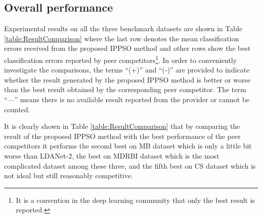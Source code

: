 \documentclass[conference]{IEEEtran}
\begin{document}
\subsection{Overall performance}\label{sec:Performance}

Experimental results on all the three benchmark datasets are shown in Table \ref{table:ResultComparison} where the last row denotes the mean classification errors received from the proposed IPPSO method and other rows show the best classification errors reported by peer competitors\footnote{It is a convention in the deep learning community that only the best result is reported.}. In order to conveniently investigate the comparisons, the terms “(+)” and “(-)” are provided to indicate whether the result generated by the proposed IPPSO method is better or worse than the best result obtained by the corresponding peer competitor. The term “—” means there is no available result reported from the provider or cannot be counted.

It is clearly shown in Table \ref{table:ResultComparison} that by comparing the result of the proposed IPPSO method with the best performance of the peer competitors it performs the second best on MB dataset which is only a little bit worse than LDANet-2, the best on MDRBI dataset which is the most complicated dataset among these three, and the fifth best on CS dataset which is not ideal but still reasonably competitive. 
\end{document}
